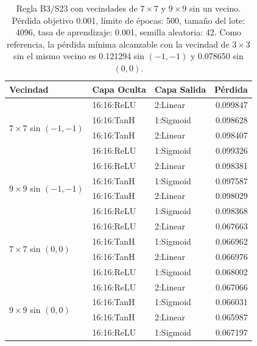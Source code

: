 \begin{table}[H]
	\centering
	\footnotesize
	\begin{tabular}{lllr}
		\toprule
		\textbf{Vecindad} & \textbf{Capa Oculta} & \textbf{Capa Salida} & \textbf{Pérdida} \\
		\midrule
		\multirow{4}{*}{$7\times7$ sin $(-1,-1)$} & 16:16:ReLU & 2:Linear & 0.099847 \\
		 & 16:16:TanH & 1:Sigmoid & 0.098628 \\
		 & 16:16:TanH & 2:Linear & 0.098407 \\
		 & 16:16:ReLU & 1:Sigmoid & 0.099326 \\
		\midrule
		\multirow{4}{*}{$9\times9$ sin $(-1,-1)$} & 16:16:ReLU & 2:Linear & 0.098381 \\
		 & 16:16:TanH & 1:Sigmoid & 0.097587 \\
		 & 16:16:TanH & 2:Linear & 0.098029 \\
		 & 16:16:ReLU & 1:Sigmoid & 0.098368 \\
		\midrule
		\multirow{4}{*}{$7\times7$ sin $(0,0)$} & 16:16:ReLU & 2:Linear & 0.067663 \\
		 & 16:16:TanH & 1:Sigmoid & 0.066962 \\
		 & 16:16:TanH & 2:Linear & 0.066976 \\
		 & 16:16:ReLU & 1:Sigmoid & 0.068002 \\
		\midrule
		\multirow{4}{*}{$9\times9$ sin $(0,0)$} & 16:16:ReLU & 2:Linear & 0.067066 \\
		 & 16:16:TanH & 1:Sigmoid & 0.066031 \\
		 & 16:16:TanH & 2:Linear & 0.065987 \\
		 & 16:16:ReLU & 1:Sigmoid & 0.067197 \\
		\bottomrule
	\end{tabular}
	\caption{Regla B3/S23 con vecindades de $7\times7$ y $9\times9$ sin un vecino. Pérdida objetivo 0.001, límite de épocas: 500, tamaño del lote: 4096, tasa de aprendizaje: 0.001, semilla aleatoria: 42. Como referencia, la pérdida mínima alcanzable con la vecindad de $3\times3$ sin el mismo vecino es 0.121294 sin $(-1,-1)$ y 0.078650 sin $(0,0)$.}
	\label{tab:vecindad_reducida_ampliada}
\end{table}
